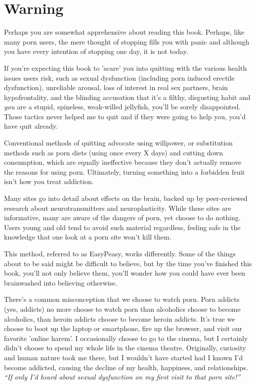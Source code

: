 \documentclass[
]{book}
\begin{document}
\hypertarget{warning}{%
\section*{Warning}\label{warning}}

Perhaps you are somewhat apprehensive about reading this book. Perhaps, like many porn users, the mere thought of stopping fills you with panic and although you have every intention of stopping one day, it is not today.

If you're expecting this book to 'scare' you into quitting with the various health issues users risk, such as sexual dysfunction (including porn induced erectile dysfunction), unreliable arousal, loss of interest in real sex partners, brain hypofrontality, and the blinding accusation that it's a filthy, disgusting habit and \emph{you} are a stupid, spineless, weak-willed jellyfish, you'll be sorely disappointed. Those tactics never helped me to quit and if they were going to help you, you'd have quit already.

Conventional methods of quitting advocate using willpower, or substitution methods such as porn diets (using once every X days) and cutting down consumption, which are equally ineffective because they don't actually remove the reasons for using porn. Ultimately, turning something into a forbidden fruit isn't how you treat addiction.

Many sites go into detail about effects on the brain, backed up by peer-reviewed research about neurotransmitters and neuroplasticity. While these sites are informative, many are aware of the dangers of porn, yet choose to do nothing. Users young and old tend to avoid such material regardless, feeling safe in the knowledge that one look at a porn site won't kill them.

This method, referred to as EasyPeasy, works differently. Some of the things about to be said might be difficult to believe, but by the time you've finished this book, you'll not only believe them, you'll wonder how you could have ever been brainwashed into believing otherwise.

There's a common misconception that we choose to watch porn. Porn addicts (yes, addicts) no more choose to watch porn than alcoholics choose to become alcoholics, than heroin addicts choose to become heroin addicts. It's true we choose to boot up the laptop or smartphone, fire up the browser, and visit our favorite 'online harem'. I occasionally choose to go to the cinema, but I certainly didn't choose to spend my whole life in the cinema theatre. Originally, curiosity and human nature took me there, but I wouldn't have started had I known I'd become addicted, causing the decline of my health, happiness, and relationships. \emph{``If only I'd heard about sexual dysfunction on my first visit to that porn site!''}
\end{document}
